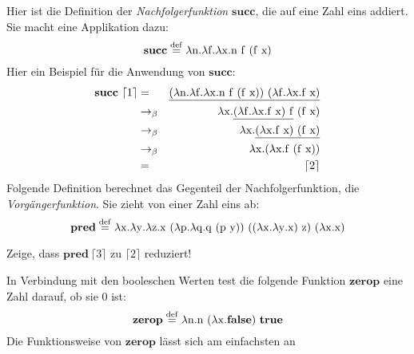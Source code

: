 Hier ist die Definition der \textit{Nachfolgerfunktion} $\mathbf{succ}$, die auf
eine Zahl eins addiert. Sie macht eine Applikation dazu:
%
\begin{displaymath}
  \mathbf{succ} \stackrel{\rm def}{=}{} \lambda \mathrm n.\lambda \mathrm f.\lambda \mathrm x.\mathrm n~\mathrm f~(\mathrm f~\mathrm x)
\end{displaymath}
%
Hier ein Beispiel für die Anwendung von $\mathbf{succ}$:
%
\begin{eqnarray*}
  \mathbf{succ}~\lceil 1\rceil & = &
\underline{(\lambda \mathrm n.\lambda \mathrm f.\lambda \mathrm x.\mathrm n~\mathrm f~(\mathrm f~\mathrm x))~(\lambda \mathrm f.\lambda \mathrm x.\mathrm f~\mathrm x)}\\
                               &\rightarrow_\beta&
                                                   \lambda \mathrm x.\underline{(\lambda \mathrm f.\lambda \mathrm x.\mathrm f~\mathrm x)~\mathrm f}~(\mathrm f~\mathrm x)
  \\
                               &\rightarrow_\beta&
                                                   \lambda \mathrm x.\underline{(\lambda \mathrm x.\mathrm f~\mathrm x)~(\mathrm f~\mathrm x)}
\\
                               &\rightarrow_\beta&
                                                   \lambda \mathrm x.(\lambda \mathrm x.\mathrm f~\mathrm (\mathrm f~\mathrm x))
  \\
  &=& \lceil 2\rceil
\end{eqnarray*}
%
Folgende Definition berechnet das Gegenteil der Nachfolgerfunktion, die \textit{Vorgängerfunktion}.
Sie zieht von einer Zahl eins ab:
%
\begin{displaymath}
  \mathbf{pred} \stackrel{\rm def}{=}{} \lambda \mathrm x.\lambda \mathrm y.\lambda \mathrm z.\mathrm x~(\lambda \mathrm p.\lambda
  \mathrm q.\mathrm q~(\mathrm p~\mathrm y))~((\lambda \mathrm x.\lambda \mathrm y.\mathrm x)~\mathrm z)~(\lambda \mathrm x.\mathrm x)
\end{displaymath}
%
\begin{aufgabeinline}
  Zeige, dass $\mathbf{pred}~\lceil 3\rceil$ zu $\lceil 2\rceil$ reduziert!
\end{aufgabeinline}
%
In Verbindung mit den booleschen Werten test die folgende Funktion
$\mathbf{zerop}$ eine Zahl darauf, ob sie $0$ ist:
%
\begin{displaymath}
  \mathbf{zerop} \stackrel{\rm def}{=}{} \lambda \mathrm n.\mathrm n~(\lambda \mathrm x.\mathbf{false})~\mathbf{true}
\end{displaymath}
%
Die Funktionsweise von $\mathbf{zerop}$ lässt sich am einfachsten an
